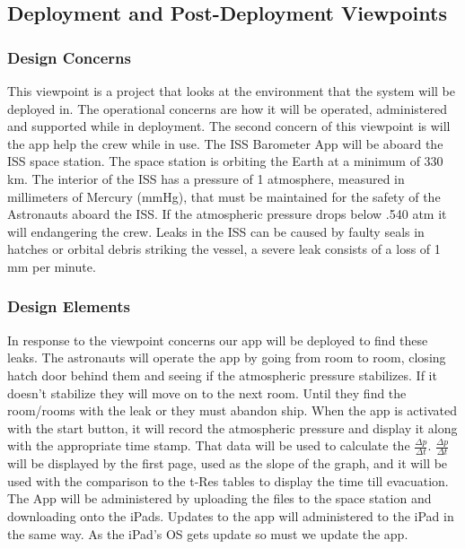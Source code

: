 \documentclass[onecolumn, draftclsnofoot,10pt, compsoc]{IEEEtran}
\begin{document}
\subsection{Deployment and Post-Deployment Viewpoints}
\subsubsection{Design Concerns}
This viewpoint is a project that looks at the environment that the system will be deployed in.
The operational concerns are how  it will be operated, administered and supported while in deployment.
The second concern of this viewpoint is will the app help the crew while in use.
The ISS Barometer App will be aboard the ISS space station.
The space station is orbiting the Earth at a minimum of 330 km.
The interior of the ISS has a pressure of 1 atmosphere, measured in millimeters of Mercury (mmHg), that must be maintained for the safety of the Astronauts aboard the ISS.
If the atmospheric pressure drops below .540 atm it will endangering the crew.
Leaks in the ISS can be caused by faulty seals in hatches or orbital debris striking the vessel, a severe leak consists of a loss of 1 mm per minute.
\subsubsection{Design Elements}
In response to the viewpoint concerns our app will be deployed to find these leaks.
The astronauts will operate the app by going from room to room, closing hatch door behind them and seeing if the atmospheric pressure stabilizes.
If it doesn't stabilize they will move on to the next room.
Until they find the room/rooms with the leak or they must abandon ship.
When the app is activated with the start button, it will record the atmospheric pressure and display it along with the appropriate time stamp.
That data will be used to calculate the $\frac{\Delta p}{\Delta t}$.
$\frac{\Delta p}{\Delta t}$ will be displayed by the first page, used as the slope of the graph, and it will be used with the comparison to the t-Res tables to display the time till evacuation.
The App will be administered by uploading the files to the space station and downloading onto the iPads.
Updates to the app will administered to the iPad in the same way. As the iPad's OS gets update so must we update the app.
\end{document}
